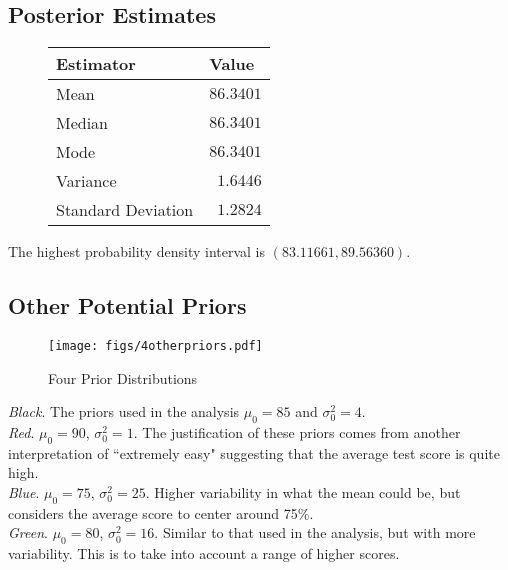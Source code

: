 \documentclass[12pt]{article}
\begin{document}
\subsection{Posterior Estimates}

\begin{figure}[H]
\begin{center}
\begin{tabular}{l|r}
Estimator & \multicolumn{1}{l}{Value} \\ \hline \hline
Mean & $86.3401$ \\
Median & $86.3401$ \\
Mode & $86.3401$ \\
Variance & $1.6446$ \\
Standard Deviation & $1.2824$ \\
\end{tabular}
\end{center}
\end{figure}

\noindent The highest probability density interval is $(83.11661, 89.56360)$.


\subsection{Other Potential Priors}

\begin{figure}[H]
\begin{center}
\texttt{[image: figs/4otherpriors.pdf]}
\caption{Four Prior Distributions}
\end{center}
\end{figure}

\noindent \textit{Black}.  The priors used in the analysis $\mu_0=85$ and $\sigma_0^2=4$. \\ [-0.3cm]

\noindent \textit{Red}. $\mu_0=90$, $\sigma_0^2=1$.  The justification of these priors comes from another interpretation of ``extremely easy" suggesting that the average test score is quite high. \\ [-0.3cm]

\noindent \textit{Blue}. $\mu_0=75$, $\sigma_0^2=25$.  Higher variability in what the mean could be, but considers the average score to center around 75\%. \\ [-0.3cm]

\noindent \textit{Green}. $\mu_0=80$, $\sigma_0^2=16$.  Similar to that used in the analysis, but with more variability.  This is to take into account a range of higher scores.
\end{document}

